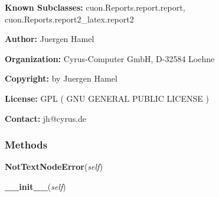     \label{cuon:Reports:MyXML:MyXML}
\textbf{Known Subclasses:}
cuon.Reports.report.report,
    cuon.Reports.report2\_latex.report2

\textbf{Author:} Juergen Hamel



\textbf{Organization:} Cyrus-Computer GmbH, D-32584 Loehne



\textbf{Copyright:} by Juergen Hamel



\textbf{License:} GPL ( GNU GENERAL PUBLIC LICENSE )



\textbf{Contact:} jh@cyrus.de





  \subsubsection{Methods}

    \label{cuon:Reports:MyXML:MyXML:NotTextNodeError}

    \vspace{0.5ex}

\hspace{.8\funcindent}\begin{boxedminipage}{\funcwidth}

    \raggedright \textbf{NotTextNodeError}(\textit{self})

\setlength{\parskip}{2ex}
\setlength{\parskip}{1ex}
    \end{boxedminipage}

    \label{cuon:Reports:MyXML:MyXML:__init__}

    \vspace{0.5ex}

\hspace{.8\funcindent}\begin{boxedminipage}{\funcwidth}

    \raggedright \textbf{\_\_init\_\_}(\textit{self})

\setlength{\parskip}{2ex}
\setlength{\parskip}{1ex}
    \end{boxedminipage}

